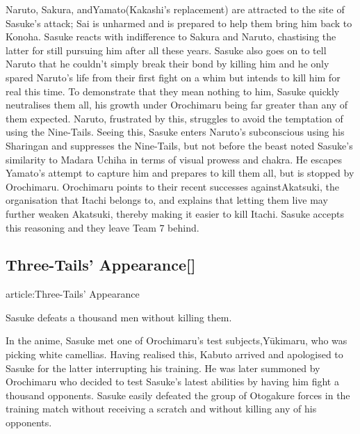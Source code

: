 \documentclass[a4paper,12pt]{article}
\begin{document}
Naruto, Sakura, andYamato(Kakashi's replacement) are attracted to the site of Sasuke's attack; Sai is unharmed and is prepared to help them bring him back to Konoha. Sasuke reacts with indifference to Sakura and Naruto, chastising the latter for still pursuing him after all these years. Sasuke also goes on to tell Naruto that he couldn't simply break their bond by killing him and he only spared Naruto's life from their first fight on a whim but intends to kill him for real this time. To demonstrate that they mean nothing to him, Sasuke quickly neutralises them all, his growth under Orochimaru being far greater than any of them expected. Naruto, frustrated by this, struggles to avoid the temptation of using the Nine-Tails. Seeing this, Sasuke enters Naruto's subconscious using his Sharingan and suppresses the Nine-Tails, but not before the beast noted Sasuke's similarity to Madara Uchiha in terms of visual prowess and chakra. He escapes Yamato's attempt to capture him and prepares to kill them all, but is stopped by Orochimaru. Orochimaru points to their recent successes againstAkatsuki, the organisation that Itachi belongs to, and explains that letting them live may further weaken Akatsuki, thereby making it easier to kill Itachi. Sasuke accepts this reasoning and they leave Team 7 behind.\\ \par \vspace{0.5cm}

\subsection*{Three-Tails' Appearance[]}\n\nMain article:Three-Tails' Appearance\\ \par \vspace{0.5cm}

Sasuke defeats a thousand men without killing them.\\ \par \vspace{0.5cm}

In the anime, Sasuke met one of Orochimaru's test subjects,Yūkimaru, who was picking white camellias. Having realised this, Kabuto arrived and apologised to Sasuke for the latter interrupting his training. He was later summoned by Orochimaru who decided to test Sasuke's latest abilities by having him fight a thousand opponents. Sasuke easily defeated the group of Otogakure forces in the training match without receiving a scratch and without killing any of his opponents.\\ \par \vspace{0.5cm}
\end{document}
